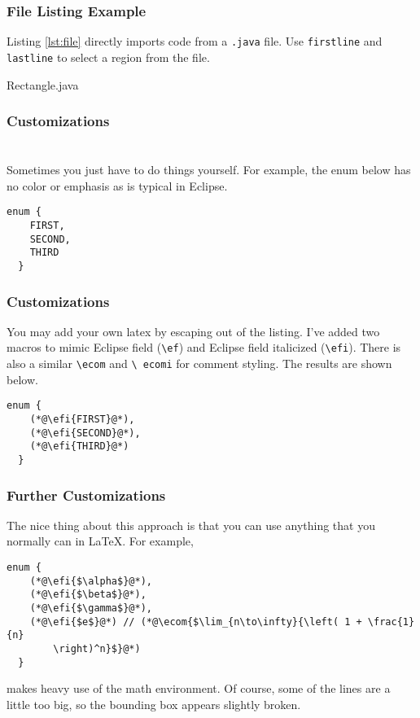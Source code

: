 \documentclass{beamer}
\begin{document}
\begin{frame}[fragile]
  \frametitle{File Listing Example}

  Listing \ref{lst:file} directly imports code from a \texttt{.java} file. Use
  \texttt{firstline} and \texttt{lastline} to select a region from the
  file.

  
  {Rectangle.java}
  
\end{frame}


\begin{frame}[fragile]
  \frametitle{Customizations}

  \section*{}

  Sometimes you just have to do things yourself.
  For example, the enum below has no color or emphasis as is typical in Eclipse. 

\begin{lstlisting}[caption={Without manual customizations.}, label={lst:nocustom}]
  enum {
    FIRST,
    SECOND,
    THIRD
  }
\end{lstlisting}

\end{frame}


\begin{frame}[fragile]
  \frametitle{Customizations}

  You may add your own latex by escaping out of the listing.  I've added
  two macros to mimic Eclipse field (\texttt{\textbackslash ef}) and
  Eclipse field italicized (\texttt{\textbackslash efi}).  There is also
  a similar \texttt{\textbackslash ecom} and \texttt{\textbackslash
    ecomi} for comment styling. The results are shown below.


\begin{lstlisting}[caption={With manual customizations.}, label={lst:custom}]
  enum {
    (*@\efi{FIRST}@*),
    (*@\efi{SECOND}@*),
    (*@\efi{THIRD}@*)
  }
\end{lstlisting}

\end{frame}


\begin{frame}[fragile]
  \frametitle{Further Customizations}

  The nice thing about this approach is that you can use anything that
  you normally can in \LaTeX.  For example,


\begin{lstlisting}[caption={Something a little different.}, label={lst:wacky}]
  enum {
    (*@\efi{$\alpha$}@*),
    (*@\efi{$\beta$}@*),
    (*@\efi{$\gamma$}@*),
    (*@\efi{$e$}@*) // (*@\ecom{$\lim_{n\to\infty}{\left( 1 + \frac{1}{n}
        \right)^n}$}@*)
  }
\end{lstlisting}

  \noindent
  makes heavy use of the math environment. Of course, some of the
  lines are a little too big, so the bounding box appears slightly broken.

  
\end{frame}
\end{document}
